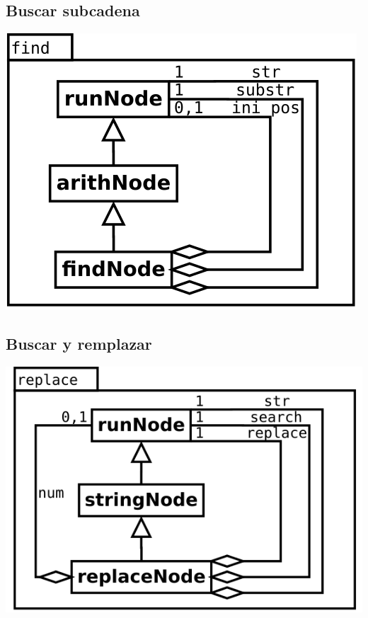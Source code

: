 \subsection {Buscar subcadena}
\begin{center}
\includegraphics[scale=0.4]{find.png} \\
\end{center}

\subsection {Buscar y remplazar}
\begin{center}
\includegraphics[scale=0.4]{replace.png} \\
\end{center}

